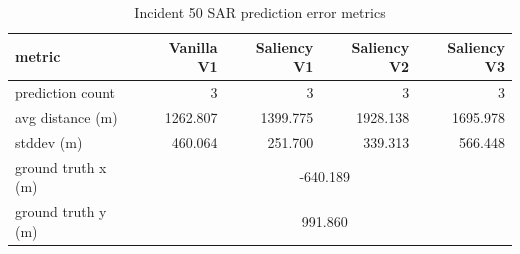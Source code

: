 \begin{table}[ht]
\centering
\caption{Incident 50 SAR prediction error metrics}
\label{tab:sar-incident-50}
\begin{tabular}{lrrrr}
\hline
metric & Vanilla V1 & Saliency V1 & Saliency V2 & Saliency V3 \\
\hline
prediction count & 3 & 3 & 3 & 3 \\
avg distance (m) & 1262.807 & 1399.775 & 1928.138 & 1695.978 \\
stddev (m) & 460.064 & 251.700 & 339.313 & 566.448 \\
ground truth x (m) & \multicolumn{4}{c}{-640.189} \\
ground truth y (m) & \multicolumn{4}{c}{991.860} \\
\hline
\end{tabular}
\end{table}
